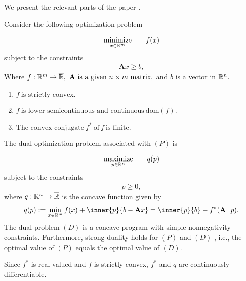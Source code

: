 We present the relevant parts of the paper \cite{Bertsekas2003}.

Consider the following optimization problem

  \begin{gather*}
    \underset{x\in \mathbb{R}^m}{\mathrm{minimize}}
    \qquad
    f(x)
  \end{gather*}
subject to the constraints
\begin{gather}
  \mathbf{A}x \ge b
  ,
\end{gather}
Where 
$
  f:
  \R^m
  \to 
  \overline{\R}
  ,
  \ 
  \mathbf{A} \ 
  \text{is a given}\ 
  n\times m
  \ 
  \text{matrix,}
$
 and $b$ is a vector in $\mathbb{R}^n.$
\begin{assumption}
  \begin{enumerate}[label={(\roman*)}]
    Assume that the map 
    $
      f: \R^m \to \overline{\R}
    $
    has the following properties.
    \item
      $
        f 
        \ 
        \text{is strictly convex.}
      $
    \item
      $
        f
        \ 
        \text{is lower-semicontinuous and continuous}
        \ 
        \mathrm{dom}(f)
        .
      $
    \item
      $
        \text{The convex conjugate}
        \ 
        f^*
        \ 
        \text{of}\ 
        f
        \ 
        \text{is finite}
        .
      $
  \end{enumerate}
\end{assumption}

The dual optimization problem associated with $(P)$
is 


  \begin{gather*}
    \underset{p\in \mathbb{R}^n}{\mathrm{maximize}}
    \qquad
    q(p)
  \end{gather*}
subject to the constraints
\begin{gather}
  p \ge 0
  ,
\end{gather}
where 
$
 q: \mathbb{R}^n \to \overline{\mathbb{R}}
$
is the concave function given by
\begin{gather}
  q(p)
  :=
  \min_{x \in \R^m}
  f(x)
  +
  \inner{p}{b - \mathbf{A}x}
  =
  \inner{p}{b}
  -
  f^*(\mathbf{A}^\top p)
  .
\end{gather}
The dual problem $(D)$ is a concave program with simple nonnegativity constraints. Furthermore, strong duality holds for $(P)$ and $(D)$
, i.e., the optimal value of $(P)$
equals the optimal value of $(D).$

Since $f^*$ is real-valued and $f$ is strictly convex, 
$f^*$ and $q$ are continuously differentiable.

